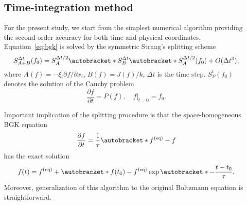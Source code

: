 \documentclass[]{elsarticle} %
\newcommand{\pder}[2][]{\frac{\partial#1}{\partial#2}}
\newcommand{\Pder}[2][]{\partial#1/\partial#2}
\newcommand{\OO}[1]{O(#1)}
\DeclarePairedDelimiter\autobracket()       %
\newcommand{\br}[1]{\autobracket*{#1}}
\newcommand{\xiai}{\xi_{j \alpha}}
\newcommand{\xiaj}{\xi_{j \beta}}
\newcommand{\equil}[1]{#1^\mathrm{(eq)}}
\begin{document}
{%

\subsection{Time-integration method}\label{sec:numerics:splitting}

For the present study, we start from the simplest numerical algorithm providing the second-order accuracy
for both time and physical coordinates.
Equation~\eqref{eq:bgk} is solved by the symmetric Strang's splitting scheme~\cite{Bobylev2001}
\begin{equation}\label{eq:Strang}
    S^{\Delta{t}}_{A+B}(f_0) = S^{\Delta{t}/2}_A \br{S^{\Delta{t}}_B \br{S^{\Delta{t}/2}_A(f_0)} } + \OO{\Delta{t}^3},
\end{equation}
where \(A(f) = -\xi_i\Pder[f]{x_i}\), \(B(f) = J(f)/k\), \(\Delta{t}\) is the time step.
\(S^t_P (f_0)\) denotes the solution of the Cauchy problem
\begin{equation}\label{eq:Cauchy}
    \pder[f]{t} = P(f), \quad f|_{t=0} = f_0.
\end{equation}

Important implication of the splitting procedure is that the space-homogeneous BGK equation
\begin{equation}\label{eq:bgk_homogeneous}
    \pder[f]{t} = \frac1\tau \br{\equil{f}-f}
\end{equation}
has the exact solution
\begin{equation}\label{eq:bgk_exact}
    f(t) = \equil{f} + \br{f(t_0)-\equil{f}}\exp\br{-\frac{t-t_0}\tau}.
\end{equation}
Moreover, generalization of this algorithm to the original Boltzmann equation is straightforward.

}
\end{document}
